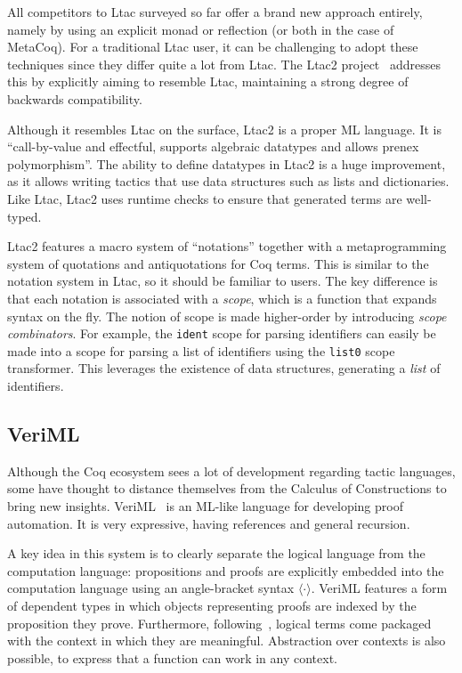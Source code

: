 All competitors to Ltac surveyed so far offer a brand new approach entirely,
namely by using an explicit monad or reflection (or both in the case of MetaCoq).
For a traditional Ltac user, it can be challenging to adopt these techniques
since they differ quite a lot from Ltac.
The Ltac2 project~\cite{ltac2} addresses this by explicitly aiming to resemble
Ltac, maintaining a strong degree of backwards compatibility.

Although it resembles Ltac on the surface, Ltac2 is a proper ML language.
It is ``call-by-value and effectful, supports algebraic datatypes and allows
prenex polymorphism''.
The ability to define datatypes in Ltac2 is a huge improvement, as it allows
writing tactics that use data structures such as lists and dictionaries.
Like Ltac, Ltac2 uses runtime checks to ensure that generated terms are
well-typed.

Ltac2 features a macro system of ``notations'' together with a metaprogramming
system of quotations and antiquotations for Coq terms.
This is similar to the notation system in Ltac, so it should be familiar to
users.
The key difference is that each notation is associated with a \emph{scope},
which is a function that expands syntax on the fly.
The notion of scope is made higher-order by introducing
\emph{scope combinators}.
For example, the \texttt{ident} scope for parsing identifiers can easily be made
into a scope for parsing a list of identifiers using the \texttt{list0} scope
transformer.
This leverages the existence of data structures, generating a \emph{list} of
identifiers.


\subsection{VeriML}

Although the Coq ecosystem sees a lot of development regarding tactic languages,
some have thought to distance themselves from the Calculus of Constructions to
bring new insights.
VeriML~\cite{Stampoulis:ICFP10, Stampoulis:POPL12} is an ML-like language for
developing proof automation.  It is very expressive, having references and
general recursion.

A key idea in this system is to clearly separate the logical language
\lhol{} from the computation language: propositions and proofs are explicitly
embedded into the computation language using an angle-bracket syntax $\langle
\cdot \rangle$.
VeriML features a form of dependent types in which objects representing proofs
are indexed by the proposition they prove.
Furthermore, following~\cite{Nanevski:ICML05,Pientka:PPDP08}, logical terms come
packaged with the context in which they are meaningful.
Abstraction over contexts is also possible, to express that a function can work
in any context.

